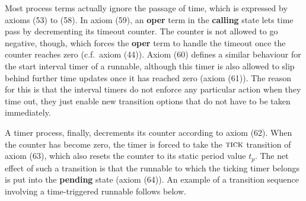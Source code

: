 \documentclass[twocolumn]{article}
\begin{document}
Most process terms actually ignore the passage of time, which is expressed by axioms (53) to (58). In axiom (59), an \textbf{oper} term in the \textbf{calling} state lets time pass by decrementing its timeout counter. The counter is not allowed to go negative, though, which forces the \textbf{oper} term to handle the timeout once the counter reaches zero (c.f.\ axiom (44)). Axiom (60) defines a similar behaviour for the start interval timer of a runnable, although this timer is also allowed to slip behind further time updates once it has reached zero (axiom (61)). The reason for this is that the interval timers do not enforce any particular action when they time out, they just enable new transition options that do not have to be taken immediately.

A timer process, finally, decrements its counter according to axiom (62). When the counter has become zero, the timer is forced to take the $\textsc{tick}$ transition of axiom (63), which also resets the counter to its static period value $t_p$. The net effect of such a transition is that the runnable to which the ticking timer belongs is put into the \textbf{pending} state (axiom (64)). An example of a transition sequence involving a time-triggered runnable follows below.
\end{document}
